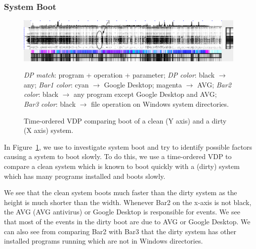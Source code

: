 \subsubsection{System Boot}
\label{sec:boot}

\begin{figure}[htb]
\includegraphics[width=1.0\textwidth]{lviz/boot-dp.png}
\caption{Time-ordered VDP comparing boot
of a clean (Y axis) and a dirty (X axis) system.
}
\label{fig:boot-dp}
{\it DP match}: program + operation + parameter;
{\it DP color}: black $\rightarrow$ any;
{\it Bar1 color}: cyan $\rightarrow$ Google Desktop; magenta $\rightarrow$ AVG;
{\it Bar2 color}: black $\rightarrow$ any program except Google Desktop and AVG;
{\it Bar3 color}: black $\rightarrow$ file operation on Windows system directories.
\end{figure}

In Figure~\ref{fig:boot-dp}, we use  to investigate system boot and try to identify possible
factors causing a system to boot slowly.
To do this, we use a time-ordered VDP to
compare a clean system which is known to boot quickly
with a (dirty) system which has many programs installed and boots slowly.

We see that the clean system boots much faster than the dirty system 
as the height is much shorter than the width.
Whenever Bar2 on the x-axis is not black,
the AVG (AVG antivirus) or Google Desktop is responsible for events.
We see that most of the events in the dirty boot are due to AVG or Google
Desktop.
We can also see from comparing Bar2 with Bar3
that the dirty system has other installed programs running
which are not in Windows directories.

